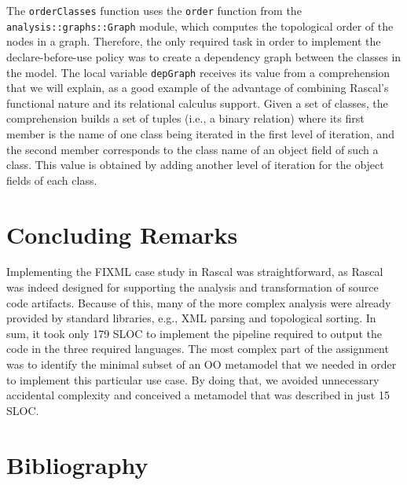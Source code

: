 \documentclass[submission,copyright,creativecommons]{eptcs}
\begin{document}
The \texttt{orderClasses} function uses the \texttt{order} function from the \texttt{analysis::graphs::Graph} module, which computes the topological order of the nodes in a graph. Therefore, the only required task in order to implement the declare-before-use policy was to create a dependency graph between the classes in the model.  The local variable \texttt{depGraph} receives its value from a comprehension that we will explain, as a good example of the advantage of combining Rascal's functional nature and its relational calculus support. Given a set of classes, the comprehension builds a set of tuples (i.e., a binary relation) where its first member is the name of one class being iterated in the first level of iteration, and the second member corresponds to the class name of an object field of such a class. This value is obtained by adding another level of iteration for the object fields of each class.

\section{Concluding Remarks}
Implementing the FIXML case study in Rascal was straightforward, as Rascal was indeed designed for supporting the analysis and transformation of source code artifacts. Because of this, many of the more complex analysis were already provided by standard libraries, e.g., XML parsing and topological sorting. In sum, it took only 179 SLOC to implement the pipeline required to output the code in the three required languages. The most complex part of the assignment was to identify the minimal subset of an OO metamodel that we needed in order to implement this particular use case. By doing that, we avoided unnecessary accidental complexity and conceived a metamodel that was described in just 15 SLOC.

\section{Bibliography}

\nocite{*}


\end{document}
